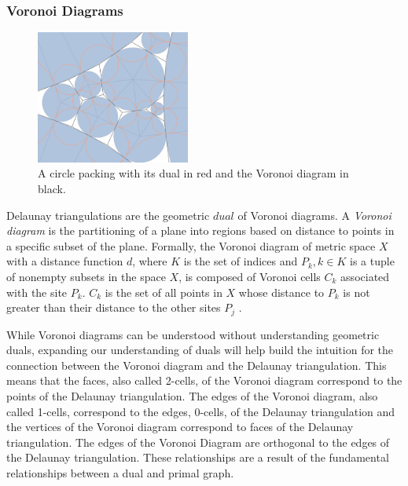 \documentclass[11pt]{article}
\begin{document}
\subsubsection{Voronoi Diagrams}

\begin{figure}
  \begin{center}
    \includegraphics[scale=.18,width=0.45\textwidth]{voronoi}
  \end{center}
  \caption{A circle packing with its dual in red and the Voronoi diagram in black.}
\end{figure}

Delaunay triangulations are the geometric $dual$ of Voronoi diagrams. A \emph{Voronoi diagram} is the partitioning of a plane into regions based on distance to points in a specific subset of the plane. Formally, the Voronoi diagram of metric space $X$ with a distance function $d$, where $K$ is the set of indices and $P_k, k \in K$ is a tuple of nonempty subsets in the space $X$, is composed of Voronoi cells $C_k$ associated with the site $P_k$. $C_k$ is the set of all points in $X$ whose distance to $P_k$ is not greater than their distance to the other sites $P_j$ \cite{voronoiDiagrams}. 

While Voronoi diagrams can be understood without understanding geometric duals, expanding our understanding of duals will help build the intuition for the connection between the Voronoi diagram and the Delaunay triangulation. This means that the faces, also called 2-cells, of the Voronoi diagram correspond to the points of the Delaunay triangulation. The edges of the Voronoi diagram, also called 1-cells, correspond to the edges, 0-cells, of the Delaunay triangulation and the vertices of the Voronoi diagram correspond to faces of the Delaunay triangulation. The edges of the Voronoi Diagram are orthogonal to the edges of the Delaunay triangulation. These relationships are a result of the fundamental relationships between a dual and primal graph.
\end{document}
